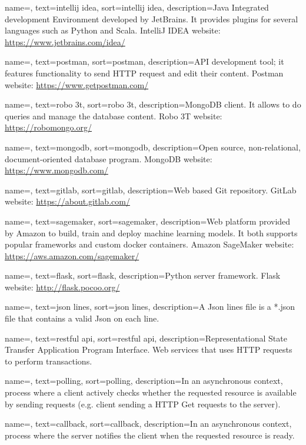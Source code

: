 {
	name=,
	text=intellij idea,
	sort=intellij idea,
	description={Java Integrated development Environment developed by JetBrains. It provides plugins for several languages such as Python and Scala. IntelliJ IDEA website: \url{https://www.jetbrains.com/idea/}}
}

{
	name=,
	text=postman,
	sort=postman,
	description={API development tool; it features functionality to send HTTP request and edit their content. Postman website: \url{https://www.getpostman.com/}}
}

{
	name=,
	text=robo 3t,
	sort=robo 3t,
	description={MongoDB client. It allows to do queries and manage the database content. Robo 3T website: \url{https://robomongo.org/}}
}

{
	name=,
	text=mongodb,
	sort=mongodb,
	description={Open source, non-relational, document-oriented database program. MongoDB website: \url{https://www.mongodb.com/}}
}

{
	name=,
	text=gitlab,
	sort=gitlab,
	description={Web based Git repository. GitLab website: \url{https://about.gitlab.com/}}
}

{
	name=,
	text=sagemaker,
	sort=sagemaker,
	description={Web platform provided by Amazon to build, train and deploy machine learning models. It both supports popular frameworks and custom docker containers. Amazon SageMaker website: \url{https://aws.amazon.com/sagemaker/}}
}

{
	name=,
	text=flask,
	sort=flask,
	description={Python server framework. Flask website: \url{http://flask.pocoo.org/}}
}

{
	name=,
	text=json lines,
	sort=json lines,
	description={A Json lines file is a *.json file that contains a valid Json on each line.}
}

{
	name=,
	text=restful api,
	sort=restful api,
	description={Representational State Transfer Application Program Interface. Web services that uses HTTP requests to perform transactions.}
}

{
	name=,
	text=polling,
	sort=polling,
	description={In an asynchronous context, process where a client actively checks whether the requested resource is available by sending requests (e.g. client sending a HTTP Get requests to the server).}
}

{
	name=,
	text=callback,
	sort=callback,
	description={In an asynchronous context, process where the server notifies the client when the requested resource is ready.}
}
